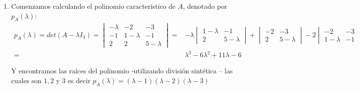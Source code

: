 \documentclass[letter]{memoir} %
\begin{document}
\begin{enumerate}
\begin{enumerate}
\item Comenzamos calculando el polinomio característico de $A$, denotado por $p_A(\lambda)$:\\
\[
\begin{split}
p_A(\lambda) = det (A-\lambda I_3) = \begin{vmatrix}
										-\lambda & -2 & -3 \\
                                        -1 & 1 -\lambda & -1 \\
                                        2 & 2& 5-\lambda
                                        \end{vmatrix} = &-\lambda \begin{vmatrix}
                                        						  1-\lambda & -1 \\
                                                                  2 & 5-\lambda
                                                                  \end{vmatrix}
                                                                  +\begin{vmatrix}
                                                                  -2 & -3 \\
                                                                  2 & 5 - \lambda
                                                                  \end{vmatrix}
                                                                  -2 \begin{vmatrix}
                                                                  -2 & -3 \\
                                                                  1-\lambda & -1
                                                                  \end{vmatrix} \\
                                                         =& \lambda^3 -6\lambda^2 +11\lambda -6 
\end{split}
\]

Y encontramos las raíces del polinomio -utilizando división sintética  – las cuales son $1,2$ y $3$ es decir $p_A(\lambda) = (\lambda - 1)(\lambda -2)(\lambda - 3)$


\end{enumerate}
\end{enumerate}
\end{document}
